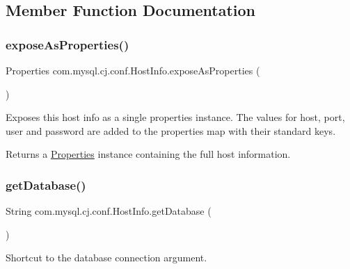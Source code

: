 \subsection{Member Function Documentation}
\mbox{\label{classcom_1_1mysql_1_1cj_1_1conf_1_1_host_info_aa316f9e75ff79e0db70ac527bbfe8cf3}} 
\subsubsection{\texorpdfstring{expose\+As\+Properties()}{exposeAsProperties()}}
{\footnotesize\ttfamily Properties com.\+mysql.\+cj.\+conf.\+Host\+Info.\+expose\+As\+Properties (\begin{DoxyParamCaption}{ }\end{DoxyParamCaption})}

Exposes this host info as a single properties instance. The values for host, port, user and password are added to the properties map with their standard keys.

\begin{DoxyReturn}{Returns}
a \mbox{\hyperlink{}{Properties}} instance containing the full host information. 
\end{DoxyReturn}
\mbox{\label{classcom_1_1mysql_1_1cj_1_1conf_1_1_host_info_aac3a26a2ad40c40bd6a2a8dfb4856a58}} 
\subsubsection{\texorpdfstring{get\+Database()}{getDatabase()}}
{\footnotesize\ttfamily String com.\+mysql.\+cj.\+conf.\+Host\+Info.\+get\+Database (\begin{DoxyParamCaption}{ }\end{DoxyParamCaption})}

Shortcut to the database connection argument.

